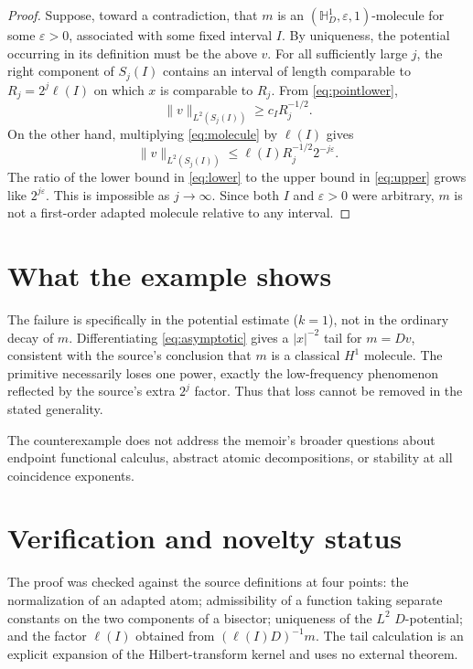 \documentclass[11pt]{article}
\begin{document}
\begin{proof}
Suppose, toward a contradiction, that $m$ is an
$(\mathbb H_D^1,\varepsilon,1)$-molecule for some $\varepsilon>0$, associated
with some fixed interval $I$.  By uniqueness, the potential occurring in its
definition must be the above $v$.  For all sufficiently large $j$, the right
component of $S_j(I)$ contains an interval of length comparable to
$R_j=2^j\ell(I)$ on which $x$ is comparable to $R_j$.  From
\eqref{eq:pointlower},
\begin{equation}\label{eq:lower}
 \|v\|_{L^2(S_j(I))}\ge c_I R_j^{-1/2}.
\end{equation}
On the other hand, multiplying \eqref{eq:molecule} by $\ell(I)$ gives
\begin{equation}\label{eq:upper}
 \|v\|_{L^2(S_j(I))}
 \le \ell(I)R_j^{-1/2}2^{-j\varepsilon}.
\end{equation}
The ratio of the lower bound in \eqref{eq:lower} to the upper bound in
\eqref{eq:upper} grows like $2^{j\varepsilon}$.  This is impossible as
$j\to\infty$.  Since both $I$ and $\varepsilon>0$ were arbitrary, $m$ is not
a first-order adapted molecule relative to any interval.
\end{proof}

\section{What the example shows}

The failure is specifically in the potential estimate ($k=1$), not in the
ordinary decay of $m$.  Differentiating \eqref{eq:asymptotic} gives a
$|x|^{-2}$ tail for $m=Dv$, consistent with the source's conclusion that
$m$ is a classical $H^1$ molecule.  The primitive necessarily loses one
power, exactly the low-frequency phenomenon reflected by the source's extra
$2^j$ factor.  Thus that loss cannot be removed in the stated generality.

The counterexample does not address the memoir's broader questions about
endpoint functional calculus, abstract atomic decompositions, or stability at
all coincidence exponents.

\section{Verification and novelty status}

The proof was checked against the source definitions at four points: the
normalization of an adapted atom; admissibility of a function taking separate
constants on the two components of a bisector; uniqueness of the $L^2$
$D$-potential; and the factor $\ell(I)$ obtained from
$(\ell(I)D)^{-1}m$.  The tail calculation is an explicit expansion of the
Hilbert-transform kernel and uses no external theorem.
\end{document}
